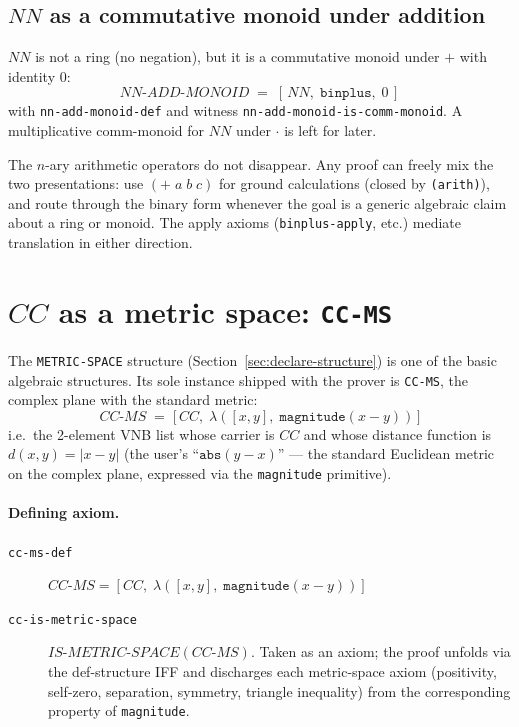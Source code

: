 \subsection{$\mathit{NN}$ as a commutative monoid under addition}

$\mathit{NN}$ is not a ring (no negation), but it is a commutative
monoid under $+$ with identity $0$:
\[
   \mathit{NN\text{-}ADD\text{-}MONOID} \;=\; [\,\mathit{NN},\;
     \mathtt{binplus},\; 0\,]
\]
with \texttt{nn-add-monoid-def} and witness
\texttt{nn-add-monoid-is-comm-monoid}.  A multiplicative
comm-monoid for $\mathit{NN}$ under $\cdot$ is left for later.

\begin{remark}
The $n$-ary arithmetic operators do not disappear.  Any proof can
freely mix the two presentations: use $(+\; a\; b\; c)$ for ground
calculations (closed by \texttt{(arith)}), and route through the
binary form whenever the goal is a generic algebraic claim about a
ring or monoid.  The apply axioms (\texttt{binplus-apply}, etc.)
mediate translation in either direction.
\end{remark}

\section{$\mathit{CC}$ as a metric space: \texttt{CC-MS}}
\label{sec:cc-ms}

The \texttt{METRIC-SPACE} structure (Section~\ref{sec:declare-structure})
is one of the basic algebraic structures.  Its sole instance shipped
with the prover is \texttt{CC-MS}, the complex plane with the standard
metric:
\[
   \mathit{CC\text{-}MS} \;=\; \bigl[\,\mathit{CC},\;
     \lambda([x, y],\; \mathtt{magnitude}(x - y))\,\bigr]
\]
i.e.\ the 2-element VNB list whose carrier is $\mathit{CC}$ and whose
distance function is $d(x, y) = |x - y|$ (the user's
``$\mathtt{abs}(y - x)$'' --- the standard Euclidean metric on the
complex plane, expressed via the \texttt{magnitude} primitive).

\paragraph{Defining axiom.}
\begin{description}
\item[\texttt{cc-ms-def}]
  $\mathit{CC\text{-}MS} = [\mathit{CC},\; \lambda([x, y],\;
   \mathtt{magnitude}(x - y))]$
\item[\texttt{cc-is-metric-space}]
  $\mathit{IS\text{-}METRIC\text{-}SPACE}(\mathit{CC\text{-}MS})$.
  Taken as an axiom; the proof unfolds via the def-structure IFF and
  discharges each metric-space axiom (positivity, self-zero,
  separation, symmetry, triangle inequality) from the corresponding
  property of \texttt{magnitude}.
\end{description}

